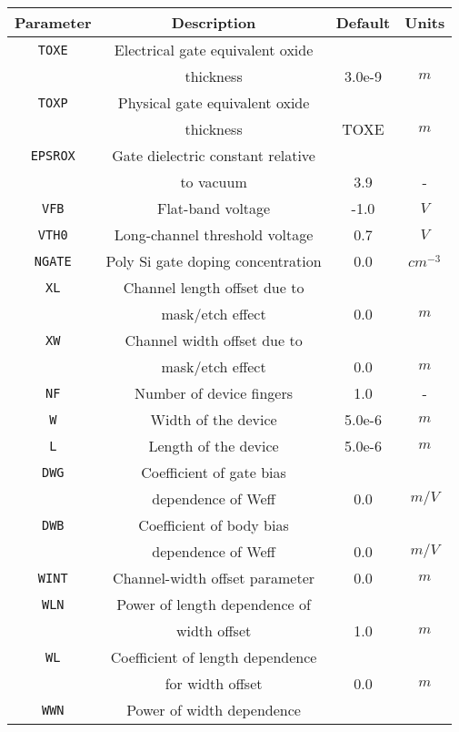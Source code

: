 \documentclass{article}
\begin{document}
\begin{table}[H]
\begin{tabular}{|c| c| c| c|}
\hline
\textbf{Parameter} & \textbf{Description} & \textbf{Default} & \textbf{Units} \\
\hline
\texttt{TOXE} & Electrical gate equivalent oxide & & \\
              & thickness & 3.0e-9 & $m$\\
\texttt{TOXP} & Physical gate equivalent oxide & & \\
              & thickness & TOXE & $m$\\
\texttt{EPSROX} & Gate dielectric constant relative & & \\
                & to vacuum & 3.9 & -\\
\texttt{VFB} & Flat-band voltage & -1.0 & $V$\\
\texttt{VTH0} & Long-channel threshold voltage & 0.7 & $V$ \\
\texttt{NGATE} & Poly Si gate doping concentration & 0.0 & $cm^{-3}$\\
\texttt{XL} & Channel length offset due to & & \\
            & mask/etch effect & 0.0 & $m$\\
\texttt{XW} & Channel width offset due to & & \\
            & mask/etch effect & 0.0 & $m$\\
\texttt{NF} & Number of device fingers & 1.0 & -\\
\texttt{W} & Width of the device & 5.0e-6 & $m$\\
\texttt{L} & Length of the device & 5.0e-6 & $m$\\
\texttt{DWG} & Coefficient of gate bias & & \\
             & dependence of Weff & 0.0 & $m/V$\\
\texttt{DWB} & Coefficient of body bias & & \\
             & dependence of Weff & 0.0 & $m/V$\\
\texttt{WINT} & Channel-width offset parameter & 0.0 & $m$\\
\texttt{WLN} & Power of length dependence of & & \\
             & width offset & 1.0 & $m$\\
\texttt{WL} & Coefficient of length dependence & & \\
            & for width offset & 0.0 & $m$\\
\texttt{WWN} & Power of width dependence & & \\

\end{tabular}
\end{table}
\end{document}
